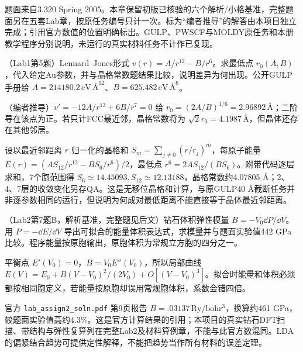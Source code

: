 题面来自3.320 Spring 2005。本章保留初版已核验的六个解析/小格基准，完整题面另在五套Lab章，按原任务编号只计一次。标为“编者推导”的解答由本项目独立完成；引用官方数值的位置明确标出。GULP、PWSCF与MOLDY原任务和本册教学程序分别说明，未运行的真实材料任务不计作已复现。
\begin{example}
（Lab1第5题）Lennard--Jones形式 $v(r)=A/r^{12}-B/r^6$。求最低点 $r_0(A,B)$，代入给定Au参数，并与晶格常数题结果比较，说明差异为何出现。公开GULP手册给 $A=214180.2\,\mathrm{eV\,\text{\AA}^{12}}$、$B=625.482\,\mathrm{eV\,\text{\AA}^6}$。
\end{example}
\begin{solution}
（编者推导）$v'=-12A/r^{13}+6B/r^7=0$ 给 $r_0=(2A/B)^{1/6}=2.96892\,\text{\AA}$；二阶导在该点为正。若只计FCC最近邻，晶格常数将为 $\sqrt2r_0=4.1987\,\text{\AA}$，但晶体还存在其他邻居。

设以最近邻距离 $r$ 归一化的晶格和 $S_m=\sum_{j\ne0}(r/r_j)^m$，每原子能量 $E(r)=(AS_{12}/r^{12}-BS_6/r^6)/2$，最低点 $r^6=2AS_{12}/(BS_6)$。附带代码逐层求和，7个胞范围得 $S_6\simeq14.45093,S_{12}\simeq12.13188$，晶格常数约4.07805 Å；2、4、7层的收敛变化另存QA。这是无移位晶格和计算，与原GULP40 Å截断任务并非逐参数相同的运行，但说明为何成对最低距离不能直接等于晶体最近邻距离。
\end{solution}

\begin{example}
（Lab2第7题B，解析基准，完整题见后文）钻石体积弹性模量 $B=-V_0\dd P/\dd V$。用 $P=-\dd E/\dd V$ 导出可拟合的能量体积表达式，求模量并与题面实验值442 GPa比较。程序能量按原胞输出，原胞体积为常规立方胞的四分之一。
\end{example}
\begin{solution}
平衡点 $E'(V_0)=0$，$B=V_0E''(V_0)$，所以局部曲线 $E(V)=E_0+B(V-V_0)^2/(2V_0)+O[(V-V_0)^3]$。拟合时能量和体积必须都按相同胞定义，若能量按原胞却误用常规胞体积，系数会错四倍。

官方 \texttt{lab\_assign2\_soln.pdf} 第9页报告 $B=.03137\,\mathrm{Ry/bohr^3}$，换算约461 GPa，较题面实验值高约4.3\%。这是官方计算结果的引用；本项目的真实钻石DFT扫描、带结构与弹性复算列在完整Lab2及材料算例章，不能与此官方数混同。LDA的偏紧结合趋势可提供定性解释，不能把趋势当作所有材料的误差定理。
\end{solution}


